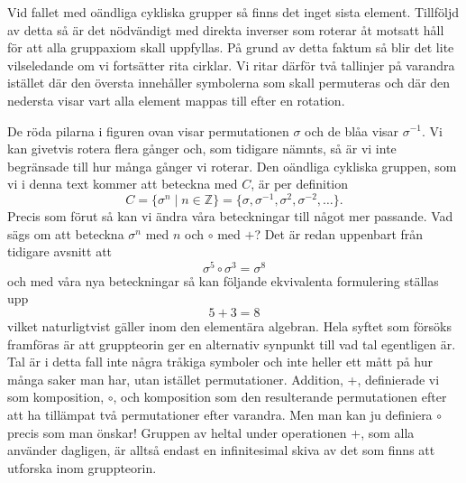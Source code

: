 \documentclass{article}
\theoremstyle{definition}
\begin{document}
Vid fallet med oändliga cykliska grupper så finns det inget sista element. 
Tillföljd av detta så är det nödvändigt 
med direkta inverser som roterar åt motsatt håll för att alla gruppaxiom skall uppfyllas. 
På grund av detta faktum så blir det lite vilseledande om vi fortsätter rita cirklar. 
Vi ritar därför två tallinjer på varandra istället där den översta innehåller symbolerna 
som skall permuteras och där den
nedersta visar vart alla element mappas till 
efter en rotation.

\begin{center}
\end{center}
De röda pilarna i figuren ovan visar permutationen $\sigma$ och de blåa visar $\sigma^{-1}$.
Vi kan givetvis rotera flera gånger och, som tidigare nämnts, så är vi inte begränsade
till hur många gånger vi roterar. 
Den oändliga cykliska gruppen, som vi i denna text kommer att beteckna med $C$, är per definition 
\[C = \{ \sigma^n \; | \; n \in \mathbb{Z} \} = 
\{ \sigma, \sigma^{-1}, \sigma^2, \sigma^{-2}, \ldots \}.\]
Precis som förut så kan vi ändra våra beteckningar till något mer passande. 
Vad sägs om att beteckna $\sigma^n$ med $n$ och $\circ$ med $+$? 
Det är redan uppenbart från tidigare avsnitt att 
\[\sigma^5 \circ \sigma^3 = \sigma^8\]
och med våra nya beteckningar så kan följande ekvivalenta formulering ställas upp
\[5 + 3 = 8\]
vilket naturligtvist gäller inom den elementära algebran. 
Hela syftet som försöks framföras är att gruppteorin ger en alternativ synpunkt till vad 
tal egentligen är. Tal är i detta fall 
inte några tråkiga symboler och inte heller ett mått på hur många 
saker man har, utan istället permutationer. Addition, +, definierade vi som komposition, $\circ$,
och komposition som den resulterande permutationen efter att ha tillämpat två permutationer 
efter varandra. Men man kan ju definiera $\circ$ precis som man önskar! 
Gruppen av heltal under operationen +, som alla använder dagligen, är alltså endast 
en infinitesimal skiva av det som finns att utforska inom gruppteorin. 
\end{document}
